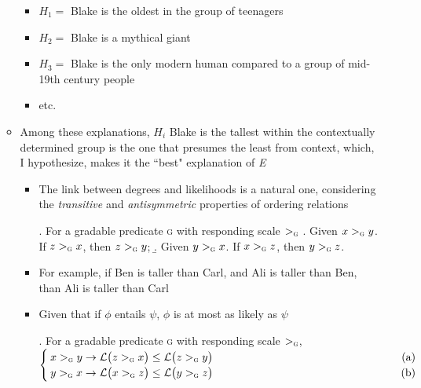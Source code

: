 \documentclass[11pt,letterpaper]{scrartcl}
\newcommand{\lreqn}[2]{\noindent\makebox[.965\linewidth]{$\displaystyle#1$\hfill(#2)}\vspace{0ex}}
\begin{document}
\begin{itemize}
\begin{itemize}
        \begin{itemize}[nosep]
            \item $H_1 =$  Blake is the oldest in the group of teenagers
            
            \item $H_2 =$ Blake is a mythical giant
            
            \item $H_3 = $ Blake is the only modern human compared to a group of mid-19th century people
            
            \item etc.
        \end{itemize}
        
        \item Among these explanations, $H_i$ Blake is the tallest within the contextually determined group is the one that presumes the least from context, which, I hypothesize, makes it the ``best" explanation of \textit{E}
            
            \begin{itemize}
                \item The link between degrees and likelihoods is a natural one, considering the \textit{transitive} and \textit{antisymmetric} properties of ordering relations
                
                \ex. For a gradable predicate \textsc{g} with responding scale $>_\textsc{g}$%
                \a. Given $ x >_\textsc{g} y$. If $z >_\textsc{g} x$, then $z >_\textsc{g} y$;
                \b. Given $ y >_\textsc{g} x$. If $x >_\textsc{g} z$, then $y >_\textsc{g} z$.
                
                \item For example, if Ben is taller than Carl, and Ali is taller than Ben, than Ali is taller than Carl
                
                \item Given that if $\phi$ entails $\psi$, $\phi$ is at most as likely as $\psi$
                
                \ex. For a gradable predicate \textsc{g} with responding scale $>_\textsc{g}$, \\ \vspace{0.25cm}
                $
                \begin{cases}
                    \lreqn{x >_\textsc{g} y \to \mathcal{L}\big( z >_\textsc{g} x \big) \leq \mathcal{L}\big( z >_\textsc{g} y\big)}{a} \\
                    \lreqn{y >_\textsc{g} x \to \mathcal{L}\big( x >_\textsc{g} z \big) \leq \mathcal{L}\big( y >_\textsc{g} z\big)}{b}
                \end{cases}
                $
                

\end{itemize}
\end{itemize}
\end{itemize}
\end{document}
